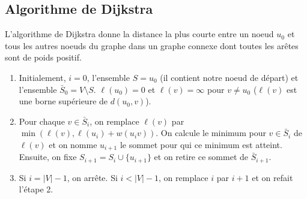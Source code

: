 \subsection{Algorithme de Dijkstra}
\begin{myalgo}
  L'algorithme de Dijkstra donne la distance la plus courte entre un noeud $u_0$ et tous les autres
  noeuds du graphe dans un graphe connexe dont toutes les arêtes sont de poids positif.
  \begin{enumerate}
    \item Initialement, $i=0$, l'ensemble $S={u_{0}}$ (il contient notre noeud de départ) et
      l'ensemble $\bar{S}_{0} = V \setminus S$.
      $\ell(u_{0})=0$ et $\ell(v)=\infty$ pour $v\ne u_{0}$ ($\ell(v)$ est une borne supérieure de $d(u_{0},v)$).
    \item Pour chaque $v \in \bar{S}_{i}$, on remplace $\ell(v)$ par $\min(\ell(v),\ell(u_{i})+w(u_{i}v))$.
      On calcule le minimum pour $v \in \bar{S}_{i}$ de $\ell(v)$ et on nomme $u_{i+1}$ le sommet pour qui ce minimum est atteint.
      Ensuite, on fixe $S_{i+1}=S_{i} \cup \{u_{i+1}\}$ et on retire ce sommet de $\bar{S}_{i+1}$.
    \item Si $i = |V| - 1$, on arrête. Si $i < |V| - 1$, on remplace $i$ par $i+1$ et on refait l'étape 2.
  \end{enumerate}
\end{myalgo}

